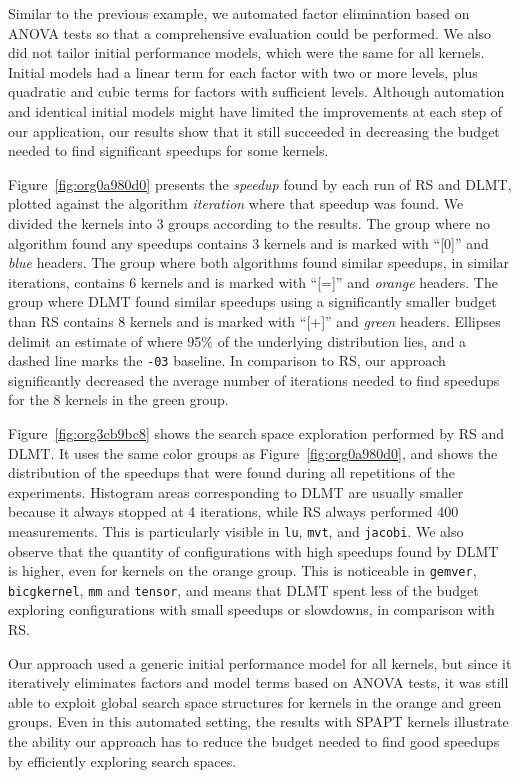 \documentclass[conference]{IEEEtran}
\begin{document}
Similar to the previous example, we automated factor elimination based on ANOVA
tests so that a comprehensive evaluation could be performed. We also did not
tailor initial performance models, which were the same for all kernels. Initial
models had a linear term for each factor with two or more levels, plus quadratic
and cubic terms for factors with sufficient levels. Although automation and
identical initial models might have limited the improvements at each step of our
application, our results show that it still succeeded in decreasing the budget
needed to find significant speedups for some kernels.

Figure~\ref{fig:org0a980d0} presents the \emph{speedup} found by each
run of RS and DLMT, plotted against the algorithm \emph{iteration} where that speedup
was found. We divided the kernels into 3 groups according to the results. The
group where no algorithm found any speedups contains 3 kernels and is marked
with ``[0]'' and \emph{blue} headers. The group where both algorithms found similar
speedups, in similar iterations, contains 6 kernels and is marked with ``[=]''
and \emph{orange} headers. The group where DLMT found similar speedups using a
significantly smaller budget than RS contains 8 kernels and is marked with
``[+]'' and \emph{green} headers. Ellipses delimit an estimate of where 95\% of the
underlying distribution lies, and a dashed line marks the \texttt{-03} baseline.
In comparison to RS, our approach significantly decreased the average number of
iterations needed to find speedups for the 8 kernels in the green group.

Figure~\ref{fig:org3cb9bc8} shows the search space exploration performed
by RS and DLMT. It uses the same color groups as
Figure~\ref{fig:org0a980d0}, and shows the distribution of the
speedups that were found during all repetitions of the experiments. Histogram
areas corresponding to DLMT are usually smaller because it always stopped at 4
iterations, while RS always performed 400 measurements. This is particularly
visible in \texttt{lu}, \texttt{mvt}, and \texttt{jacobi}. We also observe that the quantity of
configurations with high speedups found by DLMT is higher, even for kernels on
the orange group. This is noticeable in \texttt{gemver}, \texttt{bicgkernel}, \texttt{mm} and
\texttt{tensor}, and means that DLMT spent less of the budget exploring
configurations with small speedups or slowdowns, in comparison with RS.

Our approach used a generic initial performance model for all kernels, but
since it iteratively eliminates factors and model terms based on ANOVA tests,
it was still able to exploit global search space structures for kernels in the orange
and green groups. Even in this automated setting, the results with SPAPT kernels
illustrate the ability our approach has to reduce the budget needed to find good
speedups by efficiently exploring search spaces.
\end{document}
